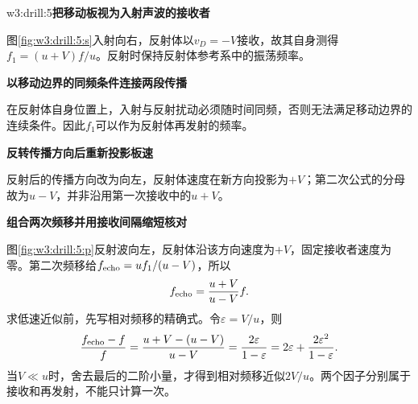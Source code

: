 \begin{drillsolution}{w3:drill:5}\textbf{把移动板视为入射声波的接收者}\par\nobreak
图\ref{fig:w3:drill:5:s}入射向右，反射体以$v_D=-V$接收，故其自身测得$f_1=(u+V)f/u$。反射时保持反射体参考系中的振荡频率。


\par\medskip{}\noindent\textbf{以移动边界的同频条件连接两段传播}\par\nobreak
在反射体自身位置上，入射与反射扰动必须随时间同频，否则无法满足移动边界的连续条件。因此$f_1$可以作为反射体再发射的频率。

\par\medskip{}\noindent\textbf{反转传播方向后重新投影板速}\par\nobreak
反射后的传播方向改为向左，反射体速度在新方向投影为$+V$；第二次公式的分母故为$u-V$，并非沿用第一次接收中的$u+V$。



\par\medskip{}\noindent\textbf{组合两次频移并用接收间隔缩短核对}\par\nobreak
图\ref{fig:w3:drill:5:p}反射波向左，反射体沿该方向速度为$+V$，固定接收者速度为零。第二次频移给$f_{\rm echo}=u f_1/(u-V)$，所以
\[
f_{\rm echo}=\frac{u+V}{u-V}f.
\]
求低速近似前，先写相对频移的精确式。令$\varepsilon=V/u$，则
\[
\frac{f_{\rm echo}-f}{f}
=\frac{u+V-(u-V)}{u-V}
=\frac{2\varepsilon}{1-\varepsilon}
=2\varepsilon+\frac{2\varepsilon^2}{1-\varepsilon}.
\]
当$V\ll u$时，舍去最后的二阶小量，才得到相对频移近似$2V/u$。两个因子分别属于接收和再发射，不能只计算一次。\end{drillsolution}
